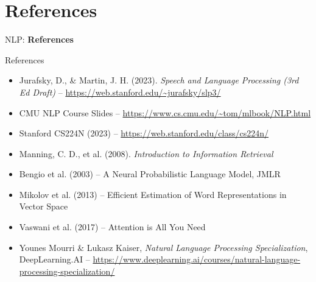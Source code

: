 \section{References}
\begin{frame}{}
    \LARGE NLP: \textbf{References}
\end{frame}

\begin{frame}[allowframebreaks]{References}
    \begin{itemize}
        \item Jurafsky, D., \& Martin, J. H. (2023). \textit{Speech and Language Processing (3rd Ed Draft)} – \url{https://web.stanford.edu/~jurafsky/slp3/}
        \item CMU NLP Course Slides – \url{https://www.cs.cmu.edu/~tom/mlbook/NLP.html}
        \item Stanford CS224N (2023) – \url{https://web.stanford.edu/class/cs224n/}
        \item Manning, C. D., et al. (2008). \textit{Introduction to Information Retrieval}
        \item Bengio et al. (2003) – A Neural Probabilistic Language Model, JMLR
        \item Mikolov et al. (2013) – Efficient Estimation of Word Representations in Vector Space
        \item Vaswani et al. (2017) – Attention is All You Need
        \item Younes Mourri \& Lukasz Kaiser, \textit{Natural Language Processing Specialization}, DeepLearning.AI – \url{https://www.deeplearning.ai/courses/natural-language-processing-specialization/}
    \end{itemize}
\end{frame}